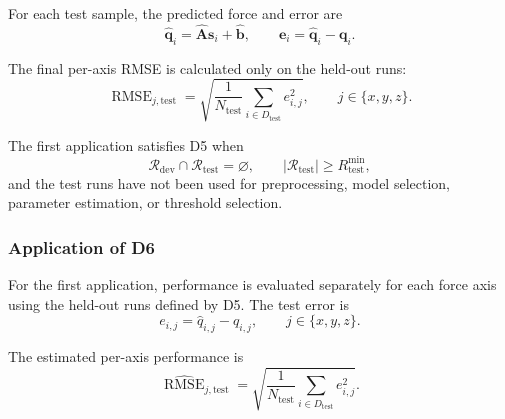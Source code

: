 \documentclass[11pt,a4paper]{article}
\begin{document}
For each test sample, the predicted force and error are
\begin{equation}
    \widehat{\mathbf{q}}_i
    =
    \widehat{\mathbf{A}}\mathbf{s}_i
    +
    \widehat{\mathbf{b}},
    \qquad
    \mathbf{e}_i
    =
    \widehat{\mathbf{q}}_i-\mathbf{q}_i.
\end{equation}

The final per-axis RMSE is calculated only on the held-out runs:
\begin{equation}
    \operatorname{RMSE}_{j,\mathrm{test}}
    =
    \sqrt{
        \frac{1}{N_{\mathrm{test}}}
        \sum_{i\in D_{\mathrm{test}}}
        e_{i,j}^{2}
    },
    \qquad
    j\in\{x,y,z\}.
\end{equation}

The first application satisfies D5 when
\begin{equation}
    \mathcal{R}_{\mathrm{dev}}
    \cap
    \mathcal{R}_{\mathrm{test}}
    =
    \varnothing,
    \qquad
    \left|\mathcal{R}_{\mathrm{test}}\right|
    \geq
    R_{\mathrm{test}}^{\min},
\end{equation}
and the test runs have not been used for preprocessing, model selection,
parameter estimation, or threshold selection.

\subsubsection{Application of D6}

For the first application, performance is evaluated separately for each force
axis using the held-out runs defined by D5. The test error is
\begin{equation}
    e_{i,j}
    =
    \widehat{q}_{i,j}-q_{i,j},
    \qquad
    j\in\{x,y,z\}.
\end{equation}

The estimated per-axis performance is
\begin{equation}
    \widehat{\operatorname{RMSE}}_{j,\mathrm{test}}
    =
    \sqrt{
        \frac{1}{N_{\mathrm{test}}}
        \sum_{i\in D_{\mathrm{test}}}
        e_{i,j}^{2}
    }.
\end{equation}
\end{document}

